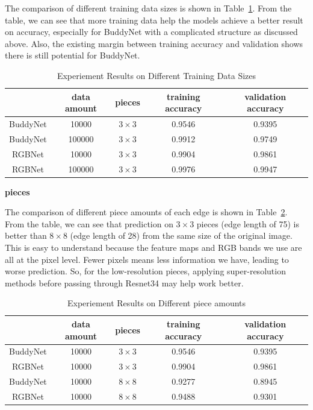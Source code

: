 \documentclass{article}
\begin{document}
The comparison of different training data sizes is shown in Table~\ref{tab:expamount}. From the table, we can see that more training data help the models achieve a better result on accuracy, especially for BuddyNet with a complicated structure as discussed above. Also, the existing margin between training accuracy and validation shows there is still potential for BuddyNet.

\begin{table}
    \caption{Experiement Results on Different Training Data Sizes}
    \centering
    \label{tab:expamount}
    \begin{tabular}{c|c|c|c|c}
        \hline
        & data amount & pieces & training accuracy & validation accuracy\\
        \hline
        BuddyNet & 10000 & $3\times 3$ & 0.9546 & 0.9395\\
        \hline
        BuddyNet & 100000 & $3\times 3$ & 0.9912 & 0.9749\\
        \hline
        RGBNet & 10000 & $3\times 3$ & 0.9904 & 0.9861\\
        \hline
        RGBNet & 100000 & $3\times 3$ & 0.9976 & 0.9947\\
        \hline
    \end{tabular}
\end{table}

\textbf{pieces}

The comparison of different piece amounts of each edge is shown in Table~\ref{tab:exppiece}. From the table, we can see that prediction on $3\times 3$ pieces (edge length of 75) is better than $8\times 8$ (edge length of 28) from the same size of the original image. This is easy to understand because the feature maps and RGB bands we use are all at the pixel level. Fewer pixels means less information we have, leading to worse prediction. So, for the low-resolution pieces, applying super-resolution methods before passing through Resnet34 may help work better.

\begin{table}
    \caption{Experiement Results on Different piece amounts}
    \centering
    \label{tab:exppiece}
    \begin{tabular}{c|c|c|c|c}
        \hline
        & data amount & pieces & training accuracy & validation accuracy\\
        \hline
        BuddyNet & 10000 & $3\times 3$ & 0.9546 & 0.9395\\
        \hline
        RGBNet & 10000 & $3\times 3$ & 0.9904 & 0.9861\\
        \hline
        BuddyNet & 10000 & $8\times 8$ & 0.9277 & 0.8945\\
        \hline
        RGBNet & 10000 & $8\times 8$ & 0.9488 & 0.9301\\
        \hline
    \end{tabular}
\end{table}
\end{document}

